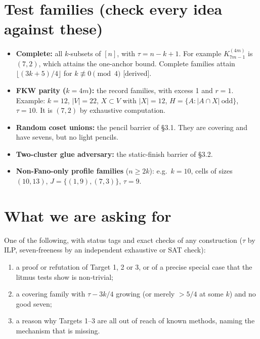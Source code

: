 \documentclass[11pt]{article}
\newcommand{\st}[1]{\textsf{\small[#1]}}
\begin{document}
\section{Test families (check every idea against these)}
\begin{itemize}
\item \textbf{Complete:} all $k$-subsets of $[n]$, with $\tau=n-k+1$. For example $K^{(4m)}_{7m-1}$ is $(7,2)$, which
attains the one-anchor bound. Complete families attain $\lfloor(3k+5)/4\rfloor$ for $k\not\equiv0\pmod4$ \st{derived}.
\item \textbf{FKW parity ($k=4m$):} the record families, with excess 1 and $r=1$. Example: $k=12$, $|V|=22$, $X\subset V$ with
$|X|=12$, $H=\{A:|A\cap X|\ \text{odd}\}$, $\tau=10$. It is $(7,2)$ by exhaustive computation.
\item \textbf{Random coset unions:} the pencil barrier of \S3.1. They are covering and have sevens, but no light pencils.
\item \textbf{Two-cluster glue adversary:} the static-finish barrier of \S3.2.
\item \textbf{Non-Fano-only profile families} ($n\ge2k$): e.g.\ $k=10$, cells of sizes $(10,13)$,
$J=\{(1,9),(7,3)\}$, $\tau=9$.
\end{itemize}

\section{What we are asking for}
One of the following, with status tags and exact checks of any construction ($\tau$ by ILP, seven-freeness by an
independent exhaustive or SAT check):
\begin{enumerate}[label=(\alph*)]
\item a proof or refutation of Target 1, 2 or 3, or of a precise special case that the litmus tests show is non-trivial;
\item a covering family with $\tau-3k/4$ growing (or merely $>5/4$ at some $k$) and no good seven;
\item a reason why Targets 1--3 are all out of reach of known methods, naming the mechanism that is missing.
\end{enumerate}
\end{document}

